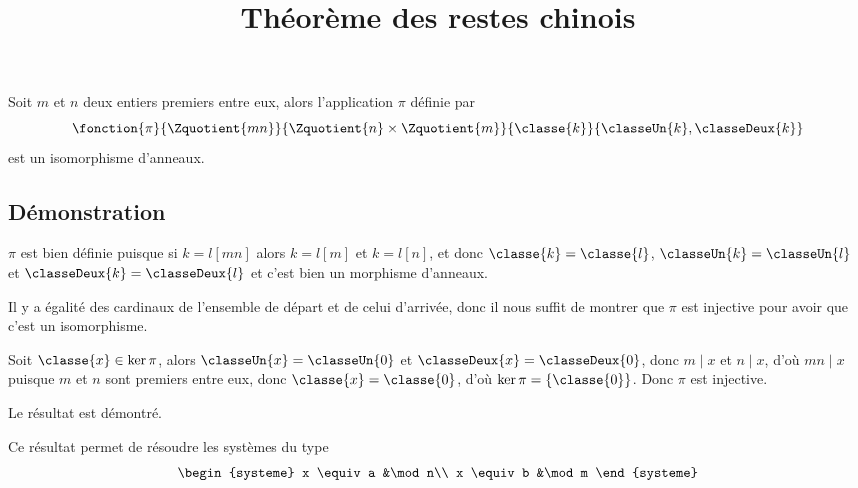 \documentclass[fontsize=12pt,twoside=false,parskip=half, french]{scrartcl}
\title{Théorème des restes chinois}
\date{}
\author{}
\begin{document}
\maketitle
   \begin{Theoreme}
      Soit $m$ et $n$ deux entiers premiers entre eux, alors l’application $\pi$
      définie par
      \[
         \fonction{\pi}{\Zquotient{mn}}{\Zquotient{n} \times \Zquotient{m}}{\classe{k}}{\classeUn{k}, \classeDeux{k}}
      \]
      est un isomorphisme d’anneaux.
   \end{Theoreme}
   \subsection{Démonstration}
      $\pi$ est bien définie puisque si $k = l [mn]$ alors $k = l[m]$ et $k = l[n]$, et donc $\classe{k} = \classe{l}$,
      $\classeUn{k} = \classeUn{l}$ et $\classeDeux{k} = \classeDeux{l}$ et c’est bien un morphisme d’anneaux.
      
      Il y a égalité des cardinaux de l’ensemble de départ et de celui d’arrivée, donc il nous suffit de montrer que
      $\pi$ est injective pour avoir que c’est un isomorphisme.
      
      Soit $\classe{x} \in \ker \pi$, alors $\classeUn{x} = \classeUn{0}$ et $\classeDeux{x} = \classeDeux{0}$, donc
      $m \mid x$ et $n \mid x$, d’où $mn \mid x$ puisque $m$ et $n$ sont premiers entre eux, donc $\classe{x} = \classe{0}$,
      d’où $\ker \pi = \left\{\classe{0}\right\}$. Donc $\pi$ est injective.
      
      Le résultat est démontré.
      
      Ce résultat permet de résoudre les systèmes du type
      \[
         \begin{systeme}
            x \equiv a &\mod n\\
            x \equiv b &\mod m
         \end{systeme}
      \]
\end{document}
